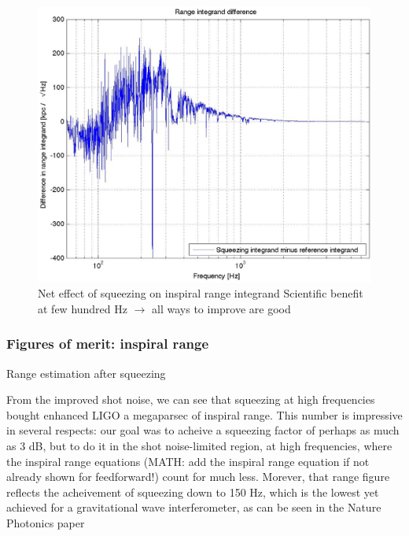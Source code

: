 \begin{figure}
\begin{center}
\includegraphics[height=0.5\paperheight, width=0.5\paperwidth,keepaspectratio]{range_integrand_difference.eps}
\caption{Net effect of squeezing on inspiral range integrand
\newline Scientific benefit at few hundred Hz $\rightarrow$ all ways to improve are good
}
\end{center}
\end{figure}




            \subsubsection{Figures of merit: inspiral range}
            \label{range_est}

                Range estimation after squeezing

		From the improved shot noise, we can see that squeezing at high frequencies bought enhanced LIGO a megaparsec of inspiral range. This number is impressive in several respects: our goal was to acheive a squeezing factor of perhaps as much as 3 dB, but to do it in the shot noise-limited region, at high frequencies, where the inspiral range equations (MATH: add the inspiral range equation if not already shown for feedforward!) count for much less. Morever, that range figure reflects the acheivement of squeezing down to 150 Hz, which is the lowest yet achieved for a gravitational wave interferometer, as can be seen in the Nature Photonics paper~\cite{BarsottiNatureSqueezing}


